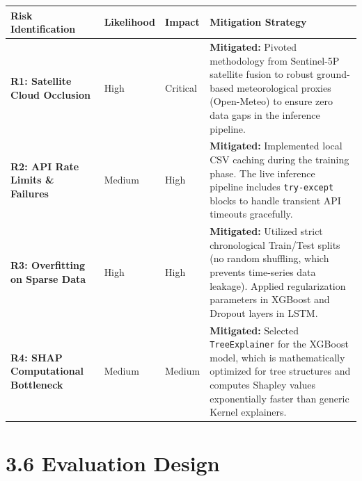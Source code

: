 {\def\LTcaptype{none} %
\begin{longtable}[]{@{}
  >{\raggedright\arraybackslash}p{}
  >{\raggedright\arraybackslash}p{}
  >{\raggedright\arraybackslash}p{}
  >{\raggedright\arraybackslash}p{}@{}}
\toprule\noalign{}
\begin{minipage}[b]{\linewidth}\raggedright
Risk Identification
\end{minipage} & \begin{minipage}[b]{\linewidth}\raggedright
Likelihood
\end{minipage} & \begin{minipage}[b]{\linewidth}\raggedright
Impact
\end{minipage} & \begin{minipage}[b]{\linewidth}\raggedright
Mitigation Strategy
\end{minipage} \\
\midrule\noalign{}
\endhead
\bottomrule\noalign{}
\endlastfoot
\textbf{R1: Satellite Cloud Occlusion} & High & Critical &
\textbf{Mitigated:} Pivoted methodology from Sentinel-5P satellite
fusion to robust ground-based meteorological proxies (Open-Meteo) to
ensure zero data gaps in the inference pipeline. \\
\textbf{R2: API Rate Limits \& Failures} & Medium & High &
\textbf{Mitigated:} Implemented local CSV caching during the training
phase. The live inference pipeline includes \texttt{try-except} blocks
to handle transient API timeouts gracefully. \\
\textbf{R3: Overfitting on Sparse Data} & High & High &
\textbf{Mitigated:} Utilized strict chronological Train/Test splits (no
random shuffling, which prevents time-series data leakage). Applied
regularization parameters in XGBoost and Dropout layers in LSTM. \\
\textbf{R4: SHAP Computational Bottleneck} & Medium & Medium &
\textbf{Mitigated:} Selected \texttt{TreeExplainer} for the XGBoost
model, which is mathematically optimized for tree structures and
computes Shapley values exponentially faster than generic Kernel
explainers. \\
\end{longtable}
}

\section{3.6 Evaluation Design}\label{evaluation-design}

